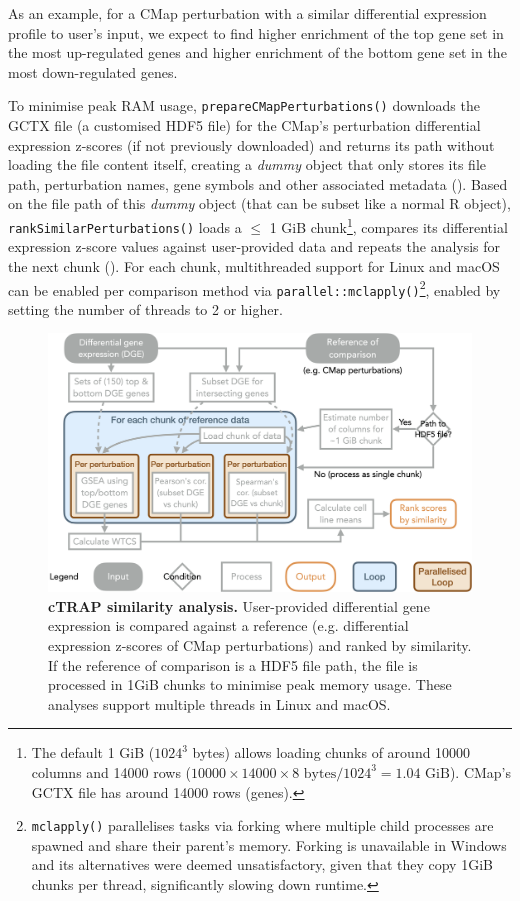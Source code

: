As an example, for a CMap perturbation with a similar differential expression profile to user’s input, we expect to find higher enrichment of the top gene set in the most up-regulated genes and higher enrichment of the bottom gene set in the most down-regulated genes.

To minimise peak RAM usage, \texttt{prepareCMapPerturbations()} downloads the GCTX file (a customised HDF5 file) for the CMap’s perturbation differential expression z-scores (if not previously downloaded) and returns its path without loading the file content itself, creating a \emph{dummy} object that only stores its file path, perturbation names, gene symbols and other associated metadata (). Based on the file path of this \emph{dummy} object (that can be subset like a normal R object), \texttt{rankSimilarPerturbations()} loads a $\le$ 1 GiB chunk\footnote{The default 1 GiB ($1024^3$ bytes) allows loading chunks of around 10000 columns and 14000 rows ($10000 \times 14000 \times 8 \textrm{ bytes} / 1024^3 = 1.04 \textrm{ GiB}$). CMap's GCTX file has around 14000 rows (genes).}, compares its differential expression z-score values against user-provided data and repeats the analysis for the next chunk (). For each chunk, multithreaded support for Linux and macOS can be enabled per comparison method via \texttt{parallel::mclapply()}\footnote{\texttt{mclapply()} parallelises tasks via forking where multiple child processes are spawned and share their parent's memory. Forking is unavailable in Windows and its alternatives were deemed unsatisfactory, given that they copy 1GiB chunks per thread, significantly slowing down runtime.}, enabled by setting the number of threads to 2 or higher.

\begin{figure}[!h]
  \includegraphics[width=.8\textwidth]{images/ctrap/analysis}
  \centering
  \caption[cTRAP similarity analysis]{\textbf{cTRAP similarity analysis.} User-provided differential gene expression is compared against a reference (e.g. differential expression z-scores of CMap perturbations) and ranked by similarity. If the reference of comparison is a HDF5 file path, the file is processed in 1GiB chunks to minimise peak memory usage. These analyses support multiple threads in Linux and macOS.}
  \label{fig:ctrap-analyses}
\end{figure}

